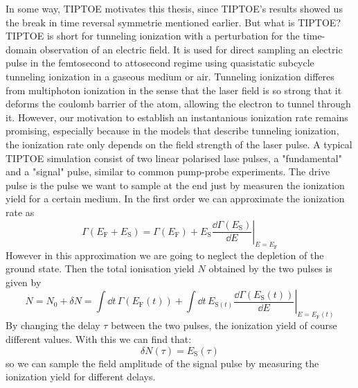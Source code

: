 In some way, TIPTOE motivates this thesis, since TIPTOE's results showed us the break in time reversal symmetrie mentioned earlier.
But what is TIPTOE? TIPTOE \cite{Park:18} is short for tunneling ionization with a perturbation for the time-domain observation of an electric field. 
It is used for direct sampling an electric pulse in the femtosecond to attosecond regime using quasistatic subcycle tunneling ionization in a gaseous medium or air.
Tunneling ionization differes from multiphoton ionization in the sense that the laser field is so strong that it deforms the coulomb barrier of the atom, allowing the electron to tunnel through it.
However, our motivation to establish an instantanious ionization rate remains promising, especially because in the models that describe tunneling ionization, the ionization rate only depends on the field strength of the laser pulse.
A typical TIPTOE simulation consist of two linear polarised lase pulses, a "fundamental" and a "signal" pulse, similar to common pump-probe experiments. 
The drive pulse is the pulse we want to sample at the end just by measuren the ionization yield for a certain medium.
In the first order we can approximate the ionization rate as
\begin{equation*}
    \Gamma(E_{\mathrm{F}}+E_{\mathrm{S}})=\Gamma(E_{\mathrm{F}})+\left.E_{\mathrm{S}}\frac{\dd \Gamma(E_{\mathrm{S}})}{\dd E}\right|_{E=E_{\mathrm{F}}}
\end{equation*}
However in this approximation we are going to neglect the depletion of the ground state. 
Then the total ionisation yield $N$ obtained by the two pulses is given by
\begin{equation*}
    N=N_0+\delta N = \int \dd t\,\Gamma(E_{\mathrm{F}}(t))+\int \dd t\,E_{\mathrm{S}(t)}\left.\frac{\dd \Gamma(E_{\mathrm{S}}(t))}{\dd E}\right|_{E=E_{\mathrm{F}}(t)}
\end{equation*}
By changing the delay $\tau$ between the two pulses, the ionization yield of course different values.
With this we can find that:
\begin{equation*}
    \delta N(\tau)=E_{\mathrm{S}}(\tau)
\end{equation*}
so we can sample the field amplitude of the signal pulse by measuring the ionization yield for different delays.
